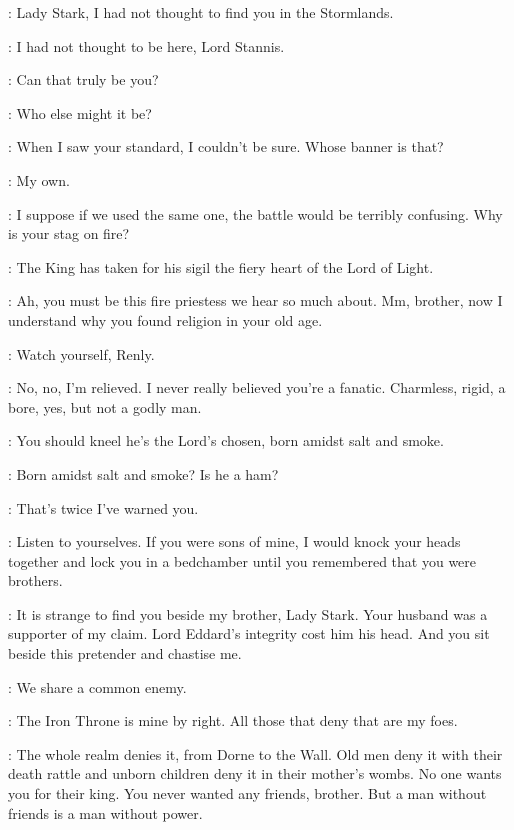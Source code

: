 
\STANNIS: Lady Stark, I had not thought to find you in the Stormlands. 

\CATELYN: I had not thought to be here, Lord Stannis. 

\RENLY:  Can that truly be you? 

\STANNIS: Who else might it be? 

\RENLY: When I saw your standard, I couldn't be sure. Whose banner is that? 

\STANNIS: My own. 

\RENLY: I suppose if we used the same one, the battle would be terribly confusing. Why is your stag on fire? 

\MELISANDRE: The King has taken for his sigil the fiery heart of the Lord of Light. 

\RENLY: Ah, you must be this fire priestess we hear so much about. Mm, brother, now I understand why you found religion in your old age. 

\STANNIS: Watch yourself, Renly. 

\RENLY: No, no, I'm relieved. I never really believed you're a fanatic. Charmless, rigid, a bore, yes, but not a godly man. 

\MELISANDRE: You should kneel he's the Lord's chosen, born amidst salt and smoke. 

\RENLY: Born amidst salt and smoke? Is he a ham? 

\STANNIS: That's twice I've warned you. 

\CATELYN: Listen to yourselves. If you were sons of mine, I would knock your heads together and lock you in a bedchamber until you remembered that you were brothers. 

\STANNIS: It is strange to find you beside my brother, Lady Stark. Your husband was a supporter of my claim. Lord Eddard's integrity cost him his head. And you sit beside this pretender and chastise me. 

\CATELYN: We share a common enemy. 

\STANNIS: The Iron Throne is mine by right. All those that deny that are my foes. 

\RENLY: The whole realm denies it, from Dorne to the Wall. Old men deny it with their death rattle and unborn children deny it in their mother's wombs. No one wants you for their king. You never wanted any friends, brother. But a man without friends is a man without power. 

